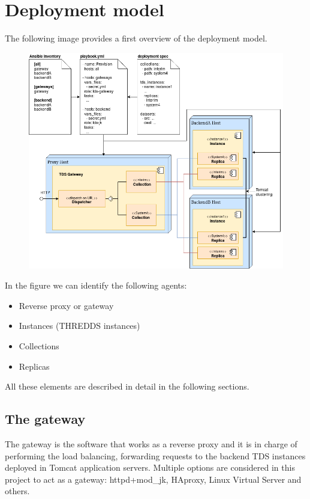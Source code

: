 \documentclass[a4paper,12pt]{article}
\begin{document}
\section{Deployment model}

The following image provides a first overview of the deployment model.

\begin{figure}[h]
\includegraphics[width=1\textwidth]{images/overview.png}
\end{figure}

In the figure we can identify the following agents:

\begin{itemize}
\item Reverse proxy or gateway
\item Instances (THREDDS instances)
\item Collections
\item Replicas
\end{itemize}

All these elements are described in detail in the following sections.

\subsection{The gateway}

The gateway is the software that works as a reverse proxy and it is in charge of performing the load balancing, forwarding requests to the backend TDS instances deployed in Tomcat application servers. Multiple options are considered in this project to act as a gateway: httpd+mod\_jk, HAproxy, Linux Virtual Server and others.
\end{document}
